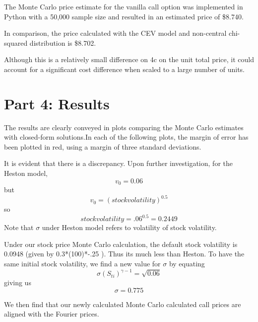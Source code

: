 \documentclass{article}
\begin{document}
The Monte Carlo price estimate for the vanilla call option was implemented in Python with a 50,000 sample size and resulted in an estimated price of \$8.740. 

In comparison, the price calculated with the CEV model and non-central chi-squared distribution is \$8.702.

Although this is a relatively small difference on 4c on the unit total price, it could account for a significant cost difference when scaled to a large number of units.

\section{Part 4: Results}

The results are clearly conveyed in plots comparing the Monte Carlo estimates with closed-form solutions.In each of the following plots, the margin of error has been plotted in red, using a margin of three standard deviations.

\begin{center}
\end{center}

\begin{center}
\end{center}

It is evident that there is a discrepancy. Upon further investigation, for the Heston model, \[v_0 = 0.06\] but \[v_0 = (stock volatility)^{0.5}\] so \[stock volatility = .06^{0.5}= 0.2449\]
Note that $\sigma$ under Heston model refers to volatility of stock volatility.

Under our stock price Monte Carlo calculation, the default stock volatility is 0.0948 (given by  0.3*(100)*-.25 ). Thus its much less than Heston. To have the same initial stock volatility, we find a new value for $\sigma$ by equating \[\sigma(S_{ti})^{\gamma-1} = \sqrt{0.06}\] giving us \[\sigma = 0.775\] 

We then find that our newly calculated Monte Carlo calculated call prices are aligned with the Fourier prices.

\begin{center}
\end{center}

\nocite{*}
\printbibliography[title=References]
\end{document}
